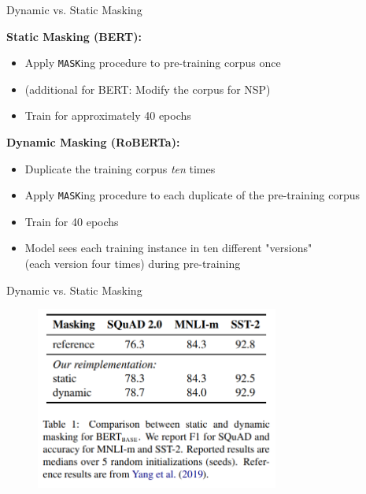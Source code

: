 
\begin{frame}{Dynamic vs. Static Masking}

\vfill

	\textbf{Static Masking (BERT):}

	\begin{itemize}
		\item Apply \texttt{MASK}ing procedure to pre-training corpus once
		\item (additional for BERT: Modify the corpus for NSP)
		\item Train for approximately 40 epochs
	\end{itemize}

\vspace{.3cm}

	\textbf{Dynamic Masking (RoBERTa):}

	\begin{itemize}
		\item Duplicate the training corpus \textit{ten} times
		\item Apply \texttt{MASK}ing procedure to each duplicate of the pre-training corpus
		\item Train for 40 epochs
		\item Model sees each training instance in ten different "versions"\\
					(each version four times) during pre-training
	\end{itemize}
	
\vfill

\end{frame}


\begin{frame}{Dynamic vs. Static Masking}

\vfill

\begin{figure}
\centering
\includegraphics[width = 8cm]{figure/roberta-dynamic.png}\\ 
\end{figure}

\vfill

\end{frame}

